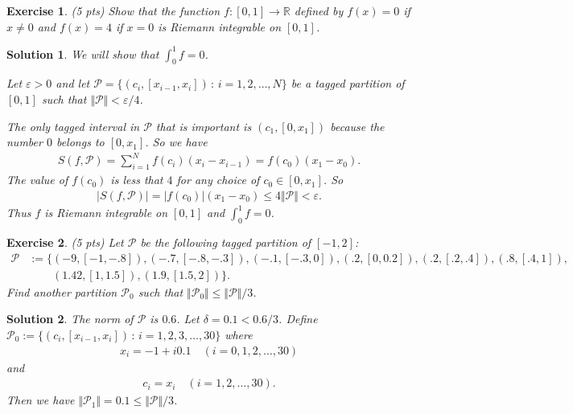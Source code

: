 \documentclass[12pt]{article}
\newcommand{\bR}{\mathbb{R}}
\newcommand{\cP}{\mathcal{P}}
\newcommand{\ra}{\rightarrow}
\theoremstyle{plain}
\newtheorem{exer}{\textbf{Exercise}}}
\theoremstyle{plain}
\newtheorem*{sol}{\textbf{Solution}}}
\theoremstyle{plain}
\theoremstyle{plain}
\begin{document}
\begin{exer}
(5 pts)
Show that the function $f : [0, 1] \ra \bR$ defined by $f(x) = 0$ if $x \neq 0$ and $f(x) = 4$ if $x = 0$ is Riemann integrable on $[0, 1]$.
\end{exer}
\begin{sol}
We will show that $\int_0^1 f = 0$.

Let $\varepsilon > 0$ and let $\cP = \{ (c_i , [x_{i - 1} , x_i ]) \, : \, i = 1 , 2, \ldots , N \}$ be a tagged partition of $[0, 1]$ such that $\Vert \cP \Vert < \varepsilon/4$. 

The only tagged interval in $\cP$ that is important is $(c_1, [0, x_1])$ because the number $0$ belongs to $[0, x_1]$. So we have
	\begin{align*}
	S (f, \cP ) = \sum_{i = 1}^N f(c_i) (x_i - x_{i-1}) = f(c_0) (x_1 - x_0) .
	\end{align*}
	The value of $f(c_0)$ is less that $4$ for any choice of $c_0 \in [0, x_1]$. So
	\begin{align*}
	|S (f, \cP)| = |f(c_0)| (x_1 - x_0) \leq 4 \Vert \cP \Vert < \varepsilon .
	\end{align*}
Thus $f$ is Riemann integrable on $[0, 1]$ and $\int_0^1 f = 0$.
\end{sol}

\begin{exer}
(5 pts)
Let $\cP$ be the following tagged partition of $[-1, 2]$:
	\begin{align*}
	\cP &:= \{ (-9, [-1, -.8]) , (-.7, [-.8, -.3]), (-.1, [-.3, 0]), (.2, [0,0.2]), (.2, [.2, .4]), (.8, [.4, 1]), \\
	& \phantom{:= \{} (1.42, [1, 1.5]), (1.9, [1.5, 2]) \} .
	\end{align*}
Find another partition $\cP_0$ such that $\Vert \cP_0 \Vert \leq \Vert \cP \Vert/3$.
\end{exer}
\begin{sol}
The norm of $\cP$ is $0.6$. Let $\delta = 0.1 < 0.6/3$. Define $\cP_0 := \{ (c_i , [x_{i - 1} , x_i]) \, : \, i = 1, 2, 3, \ldots , 30 \}$ where
	\begin{align*}
	x_i = -1 + i 0.1 \quad (i = 0, 1, 2, \ldots , 30)
	\end{align*}
and
	\begin{align*}
	c_i = x_i \quad (i = 1, 2, \ldots , 30 ) .
	\end{align*}
Then we have $\Vert \cP_1 \Vert = 0.1 \leq \Vert \cP \Vert/3$.
\end{sol}
\end{document}

